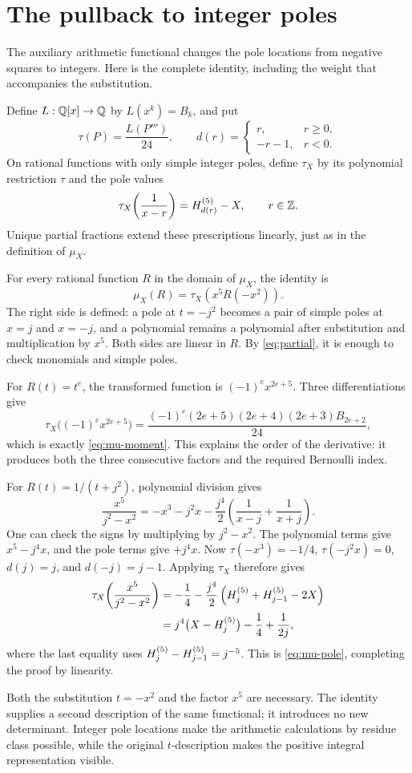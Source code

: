 \section{The pullback to integer poles}\label{app:pullback}

The auxiliary arithmetic functional changes the pole locations from
negative squares to integers. Here is the complete identity, including
the weight that accompanies the substitution.

Define $L:\mathbb Q[x]\to\mathbb Q$ by $L(x^k)=B_k$, and put
\[
 \tau(P)=\frac{L(P''')}{24},\qquad
 d(r)=\begin{cases}r,&r\geq0,\\-r-1,&r<0.\end{cases}
\]
On rational functions with only simple integer poles, define $\tau_X$
by its polynomial restriction $\tau$ and the pole values
\[
 \tau_X\!\left(\frac1{x-r}\right)=H_{d(r)}^{(5)}-X,
 \qquad r\in\mathbb Z.
\]
Unique partial fractions extend these prescriptions linearly, just as
in the definition of $\mu_X$.

For every rational function $R$ in the domain of $\mu_X$, the identity is
\begin{equation}\label{eq:pullback}
 \boxed{\mu_X(R)=\tau_X\!\left(x^5R(-x^2)\right).}
\end{equation}
The right side is defined: a pole at $t=-j^2$ becomes a pair of simple
poles at $x=j$ and $x=-j$, and a polynomial remains a polynomial after
substitution and multiplication by $x^5$. Both sides are linear in $R$.
By \eqref{eq:partial}, it is enough to check monomials and simple poles.

For $R(t)=t^e$, the transformed function is $(-1)^ex^{2e+5}$. Three
differentiations give
\[
 \tau_X\bigl((-1)^ex^{2e+5}\bigr)
 =\frac{(-1)^e(2e+5)(2e+4)(2e+3)B_{2e+2}}{24},
\]
which is exactly \eqref{eq:mu-moment}. This explains the order of the
derivative: it produces both the three consecutive factors and the
required Bernoulli index.

For $R(t)=1/(t+j^2)$, polynomial division gives
\[
 \frac{x^5}{j^2-x^2}
 =-x^3-j^2x-\frac{j^4}{2}
       \left(\frac1{x-j}+\frac1{x+j}\right).
\]
One can check the signs by multiplying by $j^2-x^2$. The polynomial
terms give $x^5-j^4x$, and the pole terms give $+j^4x$.
Now $\tau(-x^3)=-1/4$, $\tau(-j^2x)=0$, $d(j)=j$, and $d(-j)=j-1$.
Applying $\tau_X$ therefore gives
\begin{align*}
 \tau_X\!\left(\frac{x^5}{j^2-x^2}\right)
 &=-\frac14-\frac{j^4}{2}
       \left(H_{j}^{(5)}+H_{j-1}^{(5)}-2X\right)\\
 &=j^4\bigl(X-H_{j}^{(5)}\bigr)-\frac14+\frac1{2j},
\end{align*}
where the last equality uses
$H_{j}^{(5)}-H_{j-1}^{(5)}=j^{-5}$. This is \eqref{eq:mu-pole}, completing
the proof by linearity.

Both the substitution $t=-x^2$ and the factor $x^5$ are necessary.
The identity supplies a second description of the same functional;
it introduces no new determinant. Integer pole locations make the
arithmetic calculations by residue class possible, while the original
$t$-description makes the positive integral representation visible.
